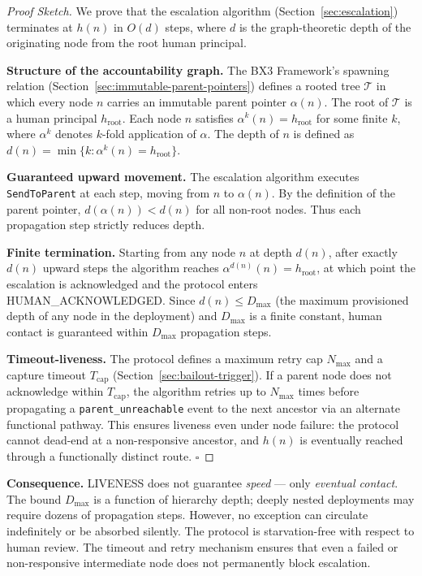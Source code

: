 \begin{proof}[Proof Sketch]
We prove that the escalation algorithm (Section~\ref{sec:escalation}) terminates at $h(n)$ in $O(d)$ steps, where $d$ is the graph-theoretic depth of the originating node from the root human principal.

\medskip\noindent\textbf{Structure of the accountability graph.} The BX3 Framework's spawning relation (Section~\ref{sec:immutable-parent-pointers}) defines a rooted tree $\mathcal{T}$ in which every node $n$ carries an immutable parent pointer $\alpha(n)$. The root of $\mathcal{T}$ is a human principal $h_{\text{root}}$. Each node $n$ satisfies $\alpha^k(n) = h_{\text{root}}$ for some finite $k$, where $\alpha^k$ denotes $k$-fold application of $\alpha$. The depth of $n$ is defined as $d(n) = \min\{k : \alpha^k(n) = h_{\text{root}}\}$.

\medskip\noindent\textbf{Guaranteed upward movement.} The escalation algorithm executes \texttt{SendToParent} at each step, moving from $n$ to $\alpha(n)$. By the definition of the parent pointer, $d(\alpha(n)) < d(n)$ for all non-root nodes. Thus each propagation step strictly reduces depth.

\medskip\noindent\textbf{Finite termination.} Starting from any node $n$ at depth $d(n)$, after exactly $d(n)$ upward steps the algorithm reaches $\alpha^{d(n)}(n) = h_{\text{root}}$, at which point the escalation is acknowledged and the protocol enters HUMAN\_ACKNOWLEDGED. Since $d(n) \leq D_{\max}$ (the maximum provisioned depth of any node in the deployment) and $D_{\max}$ is a finite constant, human contact is guaranteed within $D_{\max}$ propagation steps.

\medskip\noindent\textbf{Timeout-liveness.} The protocol defines a maximum retry cap $N_{\max}$ and a capture timeout $T_{\text{cap}}$ (Section~\ref{sec:bailout-trigger}). If a parent node does not acknowledge within $T_{\text{cap}}$, the algorithm retries up to $N_{\max}$ times before propagating a \texttt{parent\_unreachable} event to the next ancestor via an alternate functional pathway. This ensures liveness even under node failure: the protocol cannot dead-end at a non-responsive ancestor, and $h(n)$ is eventually reached through a functionally distinct route. \hfill $\square$
\end{proof}

\medskip\noindent\textbf{Consequence.} LIVENESS does not guarantee \emph{speed} — only \emph{eventual contact}. The bound $D_{\max}$ is a function of hierarchy depth; deeply nested deployments may require dozens of propagation steps. However, no exception can circulate indefinitely or be absorbed silently. The protocol is starvation-free with respect to human review. The timeout and retry mechanism ensures that even a failed or non-responsive intermediate node does not permanently block escalation.

